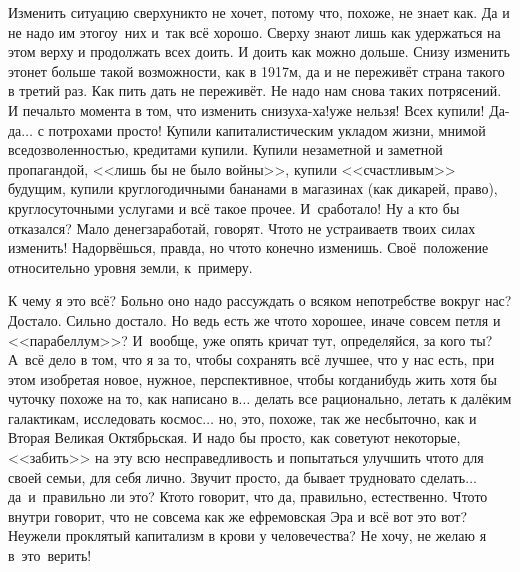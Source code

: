 Изменить ситуацию сверху\mdash никто не хочет, потому что, похоже, не знает как. Да и не надо им этого\mdash у~них и~так всё хорошо. Сверху знают лишь как удержаться на этом верху и продолжать всех доить. И доить как можно дольше. Снизу изменить это\mdash нет больше такой возможности, как в 1917\sdash м, да и не переживёт страна такого в третий раз. Как пить дать не переживёт. Не надо нам снова таких потрясений. И печаль\sdash то момента в том, что изменить снизу\mdash ха-ха!\mdash уже нельзя! Всех купили! Да-да$\ldots$ с потрохами просто! Купили капиталистическим укладом жизни, мнимой вседозволенностью, кредитами купили. Купили незаметной и заметной пропагандой, <<лишь бы не было войны>>, купили <<счастливым>> будущим, купили круглогодичными бананами в магазинах (как дикарей, право), круглосуточными услугами и всё такое прочее. И~сработало! Ну а кто бы отказался? Мало денег\mdash заработай, говорят. Что\sdash то не устраивает\mdash в твоих силах изменить! Надорвёшься, правда, но что\sdash то конечно изменишь. Своё~положение относительно уровня земли, к~примеру.

К чему я это всё? Больно оно надо рассуждать о всяком непотребстве вокруг нас? Достало. Сильно достало. Но ведь есть же что\sdash то хорошее, иначе совсем петля и <<парабеллум>>? И~вообще, уже опять кричат тут, определяйся, за кого ты? А~всё дело в том, что я за то, чтобы сохранять всё лучшее, что у нас есть, при этом изобретая новое, нужное, перспективное, чтобы когда\sdash нибудь жить хотя бы чуточку похоже на то, как написано в\cite{ТуманностьАндромеды}$\ldots$ делать все рационально, летать к далёким галактикам, исследовать космос$\ldots$ но, это, похоже, так же несбыточно, как и Вторая Великая Октябрьская. И надо бы просто, как советуют некоторые, <<забить>> на эту всю несправедливость и попытаться улучшить что\sdash то для своей семьи, для себя лично. Звучит просто, да бывает трудновато сделать$\ldots$ да~и~правильно ли это? Кто\sdash то говорит, что да, правильно, естественно. Что\sdash то внутри говорит, что не совсем\mdash а как же ефремовская Эра и всё вот это вот? Неужели проклятый капитализм в крови у человечества? Не хочу, не желаю я в~это~верить! %

